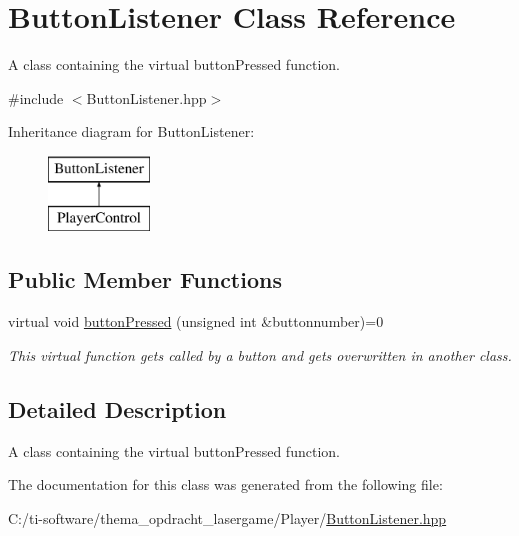 \hypertarget{class_button_listener}{}\section{Button\+Listener Class Reference}
\label{class_button_listener}


A class containing the virtual button\+Pressed function.  




{\ttfamily \#include $<$Button\+Listener.\+hpp$>$}

Inheritance diagram for Button\+Listener\+:\begin{figure}[H]
\begin{center}
\leavevmode
\includegraphics[height=2.000000cm]{class_button_listener}
\end{center}
\end{figure}
\subsection*{Public Member Functions}
\begin{DoxyCompactItemize}
\item 
\mbox{\label{class_button_listener_a669be11c0665a02e9501ee4ca03d8a8d}} 
virtual void \mbox{\hyperlink{class_button_listener_a669be11c0665a02e9501ee4ca03d8a8d}{button\+Pressed}} (unsigned int \&buttonnumber)=0
\begin{DoxyCompactList}\small\item\em This virtual function gets called by a button and gets overwritten in another class. \end{DoxyCompactList}\end{DoxyCompactItemize}


\subsection{Detailed Description}
A class containing the virtual button\+Pressed function. 

The documentation for this class was generated from the following file\+:\begin{DoxyCompactItemize}
\item 
C\+:/ti-\/software/thema\+\_\+opdracht\+\_\+lasergame/\+Player/\mbox{\hyperlink{_button_listener_8hpp}{Button\+Listener.\+hpp}}\end{DoxyCompactItemize}
